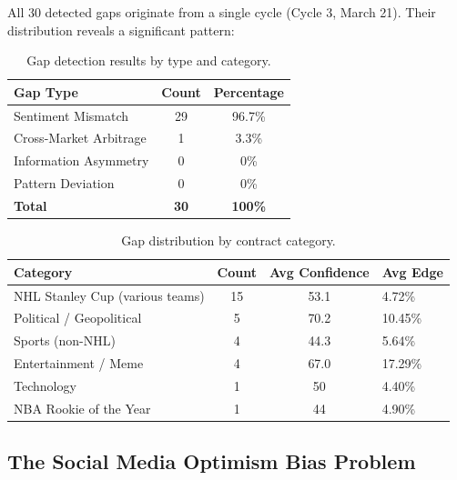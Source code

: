 \documentclass[12pt, letterpaper]{article}
\begin{document}
All 30 detected gaps originate from a single cycle (Cycle 3, March 21). Their distribution reveals a significant pattern:

\begin{table}[H]
\centering
\caption{Gap detection results by type and category.}
\label{tab:gap_dist}
\begin{tabular}{@{}lcc@{}}
\toprule
\textbf{Gap Type} & \textbf{Count} & \textbf{Percentage} \\
\midrule
Sentiment Mismatch & 29 & 96.7\% \\
Cross-Market Arbitrage & 1 & 3.3\% \\
Information Asymmetry & 0 & 0\% \\
Pattern Deviation & 0 & 0\% \\
\midrule
\textbf{Total} & \textbf{30} & \textbf{100\%} \\
\bottomrule
\end{tabular}
\end{table}

\begin{table}[H]
\centering
\caption{Gap distribution by contract category.}
\label{tab:gap_category}
\begin{tabular}{@{}lccl@{}}
\toprule
\textbf{Category} & \textbf{Count} & \textbf{Avg Confidence} & \textbf{Avg Edge} \\
\midrule
NHL Stanley Cup (various teams) & 15 & 53.1 & 4.72\% \\
Political / Geopolitical & 5 & 70.2 & 10.45\% \\
Sports (non-NHL) & 4 & 44.3 & 5.64\% \\
Entertainment / Meme & 4 & 67.0 & 17.29\% \\
Technology & 1 & 50 & 4.40\% \\
NBA Rookie of the Year & 1 & 44 & 4.90\% \\
\bottomrule
\end{tabular}
\end{table}

\subsection{The Social Media Optimism Bias Problem}
\end{document}
